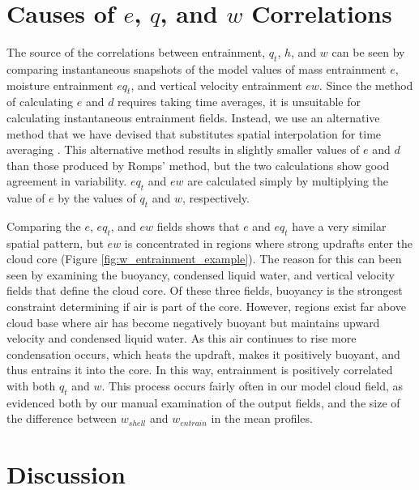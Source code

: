 \documentclass[12pt]{article}
\begin{document}

\section{Causes of $e$, $q$, and $w$ Correlations}

The source of the correlations between entrainment, $q_t$, $h$, and $w$ can 
be seen by comparing instantaneous snapshots of the model values of mass entrainment $e$, moisture entrainment $e{q_t}$, and vertical velocity 
entrainment $e{w}$.  Since the \cite{Romps2010} method of calculating 
$e$ and $d$ requires taking time averages, it is unsuitable for calculating instantaneous entrainment fields.  Instead, we use an alternative method that 
we have devised that substitutes spatial interpolation for time averaging 
\citep{Dawe2011}.  This alternative method results in slightly smaller values 
of $e$ and $d$ than those produced by Romps' method, but the two calculations
show good agreement in variability. $eq_t$ and $ew$ are calculated simply by
multiplying the value of $e$ by the values of $q_t$ and $w$, respectively.

Comparing the $e$, $eq_t$, and $ew$ fields shows that $e$ and $eq_t$ have a 
very similar spatial pattern, but $ew$ is concentrated in regions where strong
updrafts enter the cloud core (Figure \ref{fig:w_entrainment_example}).  The
reason for this can been seen by examining the buoyancy, condensed liquid water,
and vertical velocity fields that define the cloud core.  Of these three fields,
buoyancy is the strongest constraint determining if air is part of the core.
However, regions exist far above cloud base where air has become negatively buoyant but maintains upward velocity and condensed liquid water.  As this air
continues to rise more condensation occurs, which heats the updraft, makes it
positively buoyant, and thus entrains it into the core.  In this way, 
entrainment is positively correlated with both $q_t$ and $w$.  This process
occurs fairly often in our model cloud field, as evidenced both by our manual
examination of the output fields, and the size of the difference between 
$w_{shell}$ and $w_{entrain}$ in the mean profiles.


\section{Discussion}
\end{document}
